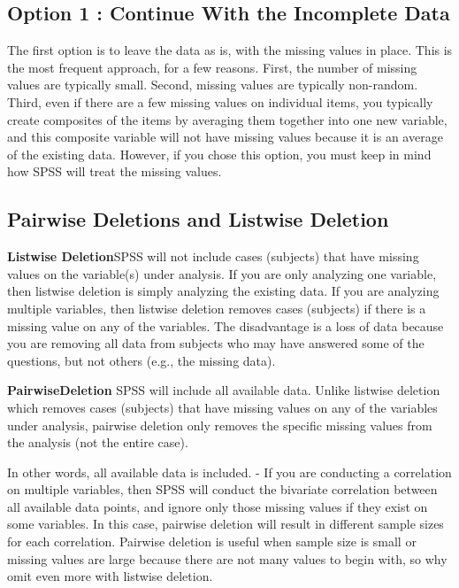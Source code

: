 \documentclass[12pt]{article} %
\begin{document}
\subsection{Option 1 : Continue With the Incomplete Data}
The first option is to leave the data as is, with the missing values in place. This is the most frequent approach, for a few reasons. First, the number of missing values are typically small. Second, missing values are typically non-random. Third, even if there are a few missing values on individual items, you typically create composites of the items by averaging them together into one new variable, and this composite variable will not have missing values because it is an average of the existing data. However, if you chose this option, you must keep in mind how SPSS will treat the missing values.

\subsection{Pairwise Deletions and Listwise Deletion}

\noindent \textbf{Listwise Deletion}SPSS will not include cases (subjects) that have missing values on the variable(s) under analysis. If you are only analyzing one variable, then listwise deletion is simply analyzing the existing data. If you are analyzing multiple variables, then listwise deletion removes cases (subjects) if there is a missing value on any of the variables. The disadvantage is a loss of data because you are removing all data from subjects who may have answered some of the questions, but not others (e.g., the missing data).\\ \bigskip

\noindent \textbf{PairwiseDeletion} SPSS will include all available data. Unlike listwise deletion which removes cases (subjects) that have missing values on any of the variables under analysis, pairwise deletion only removes the specific missing values from the analysis (not the entire case).

In other words, all available data is included.  - If you are conducting a correlation on multiple variables, then SPSS will conduct the bivariate correlation between all available data points, and ignore only those missing values if they exist on some variables. In this case, pairwise deletion will result in different sample sizes for each correlation. Pairwise deletion is useful when sample size is small or missing values are large because there are not many values to begin with, so why omit even more with listwise deletion.
\end{document}
